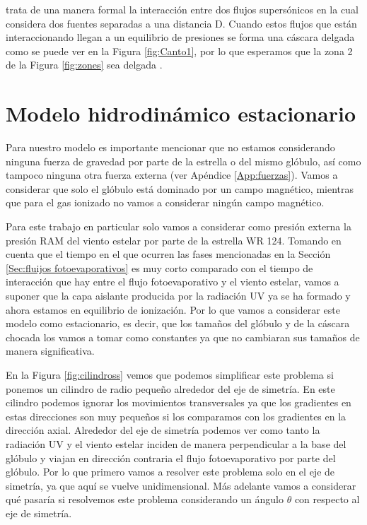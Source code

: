 \documentclass{book}
\begin{document}
\cite{Canto:1996} trata de una manera formal la interacción entre dos flujos supersónicos en la cual considera dos fuentes separadas a una distancia D. Cuando estos flujos que están interaccionando llegan a un equilibrio de presiones se forma una cáscara delgada como se puede ver en la Figura \ref{fig:Canto1}, por lo que esperamos que la zona 2 de la Figura \ref{fig:zones} sea delgada \citep{Wil:2019}.


\section{Modelo hidrodinámico estacionario}

Para nuestro modelo es importante mencionar que no estamos considerando ninguna fuerza de gravedad por parte de la estrella o del mismo glóbulo, así como tampoco ninguna otra fuerza externa (ver Apéndice \ref{App:fuerzas}). Vamos a considerar que solo el glóbulo está dominado por un campo magnético, mientras que para el gas ionizado no vamos a considerar ningún campo magnético.

Para este trabajo en particular solo vamos a considerar como presión externa la presión RAM del viento estelar por parte de la estrella WR 124. Tomando en cuenta que el tiempo en el que ocurren las fases mencionadas en la Sección \ref{Sec:fluijos fotoevaporativos} es muy corto comparado con el tiempo de interacción que hay entre el flujo fotoevaporativo y el viento estelar, vamos a suponer que la capa aislante producida por la radiación UV ya se ha formado y ahora estamos en equilibrio de ionización. Por lo que vamos a considerar este modelo como estacionario, es decir, que los tamaños del glóbulo y de la cáscara chocada los vamos a tomar como constantes ya que no cambiaran sus tamaños de manera significativa.

En la Figura \ref{fig:cilindross} vemos que podemos simplificar este problema si ponemos un cilindro de radio pequeño alrededor del eje de simetría.  En este cilindro podemos ignorar los movimientos transversales ya que los gradientes en estas direcciones son muy pequeños si los comparamos con los gradientes en la dirección axial. Alrededor del eje de simetría podemos ver como tanto la radiación UV y el viento estelar inciden de manera perpendicular a la base del glóbulo y viajan en dirección contraria el flujo fotoevaporativo por parte del glóbulo. Por lo que primero vamos a resolver este problema solo en el eje de simetría, ya que aquí se vuelve unidimensional. Más adelante vamos a considerar qué pasaría si resolvemos este problema considerando un ángulo $\theta$ con respecto al eje de simetría.
\end{document}

